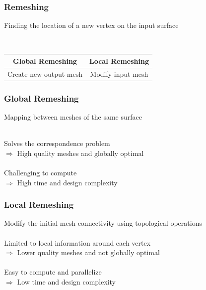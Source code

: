 \documentclass[aspectratio=43,sanserif,professionalfonts]{beamer}
\begin{document}
\begin{frame}
	\frametitle{Remeshing}
	\begin{tcolorbox}[colback=green!5,colframe=green!40!black,title=Correlation Problem]
		Finding the location of a new vertex on the input surface
	\end{tcolorbox}
	\pause
	\centering
	~\\
	\begin{tabular}{c|c}
		\textbf{Global Remeshing} & \textbf{Local Remeshing} \\
		\hline
		Create new output mesh & Modify input mesh
	\end{tabular}
\end{frame}

\begin{frame}
	\frametitle{Global Remeshing}
	\begin{tcolorbox}[colback=green!5,colframe=green!40!black,title=Mesh Parameterization]
		Mapping between meshes of the same surface
	\end{tcolorbox}
	\pause
	~\\
	Solves the correspondence problem\\
	{\color{mygreen} $\Rightarrow$ High quality meshes and globally optimal}\\
	\pause
	~\\
	Challenging to compute\\
	{\color{red} $\Rightarrow$ High time and design complexity}
\end{frame}

\begin{frame}
	\frametitle{Local Remeshing}
	Modify the initial mesh connectivity using topological operations\\
	\pause
	~\\
	Limited to local information around each vertex\\
	{\color{red} $\Rightarrow$ Lower quality meshes and not globally optimal}\\
	\pause
	~\\
	Easy to compute and parallelize \\
	{\color{mygreen} $\Rightarrow$ Low time and design complexity}
\end{frame}
\end{document}

